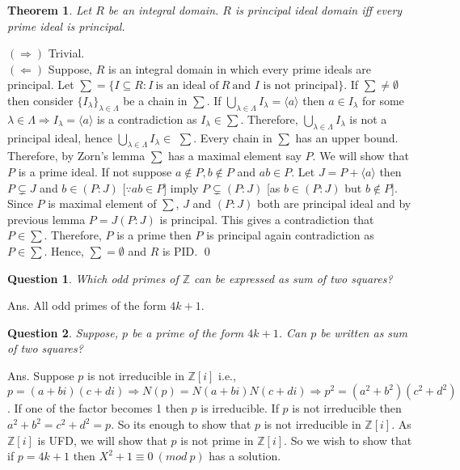 \documentclass[11pt]{amsart}
\newtheorem{theorem}{Theorem}[section]
\newtheorem*{qns*}{Question}
\newcommand{\ZZ}{\mathbb Z}
\newcommand{\gen}[1]{\langle#1\rangle}
\begin{document}
\begin{theorem}

Let $R$ be an integral domain. $R$ is principal ideal domain iff every prime ideal is principal.

\end{theorem}

\proof $(\Rightarrow)$ Trivial.\\

$(\Leftarrow)$ Suppose, $R$ is an integral domain in which every prime ideals are principal. Let $\sum=\{I\subseteq R:I~\text{is an ideal of}~R~\text{and $I$ is not principal}\}.$ If $\sum \neq \emptyset$ then consider $\{I_{\lambda}\}_{\lambda\in \Lambda}$ be a chain in $\sum$. If $\displaystyle\bigcup_{\lambda\in \Lambda} I_{\lambda}=\gen{a}$ then $a\in I_{\lambda}$ for some $\lambda\in \Lambda \Rightarrow I_{\lambda}=\gen{a}$ is a contradiction as $I_{\lambda}\in \sum.$ Therefore, $\displaystyle\bigcup_{\lambda\in \Lambda} I_{\lambda}$ is not a principal ideal, hence $\displaystyle\bigcup_{\lambda\in \Lambda} I_{\lambda}\in $ $\sum$. Every chain in $\sum$ has an upper bound. Therefore, by Zorn's lemma $\sum$ has a maximal element say $P.$ We will show that $P$ is a prime ideal. If not suppose $a\notin P,b\notin P$ and $ab\in P$. Let $J=P+\gen{a}$ then $P\subsetneq J$ and $b\in (P:J)$ [$\because ab\in P$] imply $P\subsetneq (P:J)$ [as $b\in (P:J)$ but $b\notin P$]. Since $P$ is maximal element of $\sum$, $J$ and $(P:J)$ both are principal ideal and by previous lemma $P=J(P:J)$ is principal. This gives a contradiction that $P\in \sum.$ Therefore, $P$ is a prime then $P$ is principal again contradiction as $P\in \sum.$ Hence, $\sum =\emptyset$ and $R$ is PID. \qed

















\begin{qns*}
Which odd primes of ${\ZZ}$ can be expressed as sum of two squares?
\end{qns*}
Ans. All odd primes of the form $4k+1.$
\begin{qns*}
Suppose, $p$ be a prime of the form $4k+1$. Can $p$ be written as sum of two squares?
\end{qns*}
Ans. Suppose $p$ is not irreducible in ${\ZZ}[i]$ i.e., $p=(a+bi)(c+di) \Rightarrow N(p)=N(a+bi)N(c+di) \Rightarrow p^2=(a^2+b^2)(c^2+d^2)$. If one of the factor becomes 1 then $p$ is irreducible. If $p$ is not irreducible then $a^2+b^2=c^2+d^2=p$. So its enough to show that $p$ is not irreducible in ${\ZZ}[i].$ As ${\ZZ}[i]$ is UFD, we will show that $p$ is not prime in ${\ZZ}[i].$ So we wish to show that if $p=4k+1$ then $X^2+1\equiv 0~(mod~p)$ has a solution.
\end{document}
